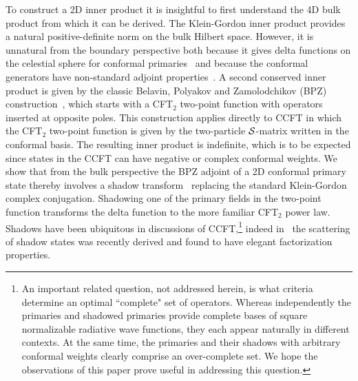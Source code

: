 \documentclass[11pt]{article}
\numberwithin{equation}{section}
\begin{document}
To construct a 2D inner product it is insightful to first understand the 4D bulk product from which it can be derived. The Klein-Gordon inner product provides a natural positive-definite norm on the bulk Hilbert space. However, it is unnatural from the boundary perspective both because it gives delta functions on the celestial sphere for conformal primaries~\cite{Pasterski:2016qvg,Pasterski:2017kqt} and because the conformal generators have non-standard adjoint properties~\cite{Bousso:2001mw,Ng:2012xp}.  A second conserved inner product is given by the classic Belavin, Polyakov and Zamolodchikov (BPZ) construction~\cite{Belavin:1984vu}, which starts with a CFT$_2$ two-point function  with  operators inserted at  opposite poles. This construction applies directly to CCFT in which the CFT$_2$ two-point function is given by the two-particle $\cal S$-matrix written in the conformal basis. The resulting inner product is indefinite, which is to be expected since states in the CCFT can have negative or complex conformal weights. We show that from the bulk perspective the BPZ adjoint of a 2D conformal primary state thereby involves a shadow transform~\cite{Ferrara:1972uq,SimmonsDuffin:2012uy} replacing  the standard Klein-Gordon complex conjugation. Shadowing one of the primary fields in the two-point function transforms the delta function to the more familiar CFT$_2$ power law. Shadows have been ubiquitous in discussions of CCFT,\footnote{An important related question, not addressed herein, is what criteria determine an optimal ``complete"  set of operators. Whereas independently the primaries and shadowed primaries provide complete bases of square normalizable radiative wave functions, they each appear naturally in different contexts. At the same time,  the primaries and their shadows with arbitrary conformal weights clearly comprise an over-complete set. We hope the observations of this paper prove useful in addressing this question.} indeed in~\cite{Fan:2021isc} the scattering of shadow states was recently derived and found to have elegant factorization properties.    
    
\end{document}
